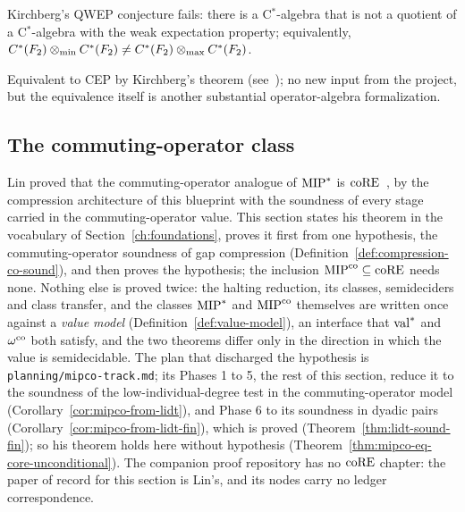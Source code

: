 \begin{corollary}[QWEP]
\label{cor:qwep}
Kirchberg's QWEP conjecture fails: there is a C$^*$-algebra that is not a quotient of
a C$^*$-algebra with the weak expectation property; equivalently,
$C^*(F_2) \otimes_{\min} C^*(F_2) \neq C^*(F_2) \otimes_{\max} C^*(F_2)$.
\end{corollary}

Equivalent to CEP by Kirchberg's theorem (see~\cite{Oza13}); no new input from the
project, but the equivalence itself is another substantial operator-algebra
formalization.

\subsection{The commuting-operator class}
\label{sec:ds-mipco}

Lin proved that the commuting-operator analogue of $\mathrm{MIP}^*$ is $\mathrm{coRE}$~\cite{Lin25}, by
the compression architecture of this blueprint with the soundness of every stage carried in
the commuting-operator value. This section states his theorem in the vocabulary of
Section~\ref{ch:foundations}, proves it first from one hypothesis, the commuting-operator
soundness of gap compression (Definition~\ref{def:compression-co-sound}), and then proves the
hypothesis; the inclusion $\mathrm{MIP}^{\mathrm{co}} \subseteq \mathrm{coRE}$ needs none. Nothing else is proved twice: the halting
reduction, its classes, semideciders and class transfer, and the classes $\mathrm{MIP}^*$ and
$\mathrm{MIP}^{\mathrm{co}}$ themselves are written once against a \emph{value model}
(Definition~\ref{def:value-model}), an interface that $\mathrm{val}^*$ and $\omega^{\mathrm{co}}$ both satisfy,
and the two theorems differ only in the direction in which the value is semidecidable. The
plan that discharged the hypothesis is \texttt{planning/mipco-track.md}; its Phases 1 to 5, the
rest of this section, reduce it to the soundness of the low-individual-degree test in the
commuting-operator model (Corollary~\ref{cor:mipco-from-lidt}), and Phase 6 to its soundness in
dyadic pairs (Corollary~\ref{cor:mipco-from-lidt-fin}), which is proved
(Theorem~\ref{thm:lidt-sound-fin}); so his theorem holds here without hypothesis
(Theorem~\ref{thm:mipco-eq-core-unconditional}). The companion proof
repository has no $\mathrm{coRE}$ chapter: the paper of record for this section is Lin's, and its
nodes carry no ledger correspondence.

